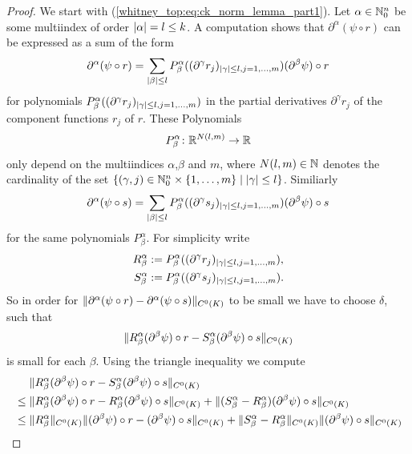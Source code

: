 \begin{proof}
    We start with (\ref{whitney_top:eq:ck_norm_lemma_part1}). Let $\alpha \in \mathbb{N}_0^n$ be some multiindex of order $\lvert\alpha\rvert = l \leq k$. A computation shows that $\partial^\alpha(\psi \circ r)$ can be expressed as a sum of the form 
    \[
    \partial^\alpha(\psi \circ r) = \sum_{\lvert\beta\rvert\leq l} P_\beta^\alpha((\partial^\gamma r_j)_{\lvert\gamma\rvert \leq l, j = 1,\ldots,m}) (\partial^\beta \psi) \circ r
    \]
    for polynomials $P_\beta^\alpha((\partial^\gamma r_j)_{\lvert\gamma\rvert \leq l, j = 1,\ldots,m})$ in the partial derivatives $\partial^\gamma r_j$ of the component functions $r_j$ of $r$. These Polynomials 
    \[
    P_\beta^\alpha \colon \mathbb{R}^{N(l,m)} \to \mathbb{R}
    \]
    only depend on the multiindices $\alpha$,$\beta$ and $m$, where $N(l,m) \in \mathbb{N}$ denotes the cardinality of the set $\{(\gamma,j) \in \mathbb{N}_0^n \times \{1,\ldots,m\} \mid \lvert\gamma\rvert \leq l\}$. Similiarly 
    \[
    \partial^\alpha(\psi \circ s) = \sum_{\lvert\beta\rvert\leq l} P_\beta^\alpha((\partial^\gamma s_j)_{\lvert\gamma\rvert \leq l, j = 1,\ldots,m}) (\partial^\beta \psi) \circ s
    \]
    for the same polynomials $P_\beta^\alpha$. For simplicity write 
    \begin{align*}
        R_\beta^\alpha &:= P_\beta^\alpha((\partial^\gamma r_j)_{\lvert\gamma\rvert \leq l, j = 1,\ldots,m}), \\
        S_\beta^\alpha &:= P_\beta^\alpha((\partial^\gamma s_j)_{\lvert\gamma\rvert \leq l, j = 1,\ldots,m}).
    \end{align*}
    So in order for $\lVert\partial^\alpha(\psi \circ r) - \partial^\alpha(\psi \circ s)\rVert_{C^0(K)}$ to be small we have to choose $\delta$, such that 
    \[
    \lVert R_\beta^\alpha (\partial^\beta \psi) \circ r - S_\beta^\alpha (\partial^\beta \psi) \circ s\rVert_{C^0(K)}
    \]
    is small for each $\beta$. Using the triangle inequality we compute 
    \begin{align}
        & \phantom{{}\leq{}} \norm{R_\beta^\alpha (\partial^\beta \psi) \circ r - S_\beta^\alpha (\partial^\beta \psi) \circ s}_{C^0(K)} \notag \\ 
        &\leq \norm{R_\beta^\alpha (\partial^\beta \psi) \circ r - R_\beta^\alpha (\partial^\beta \psi) \circ s}_{C^0(K)} + \norm{(S_\beta^\alpha - R_\beta^\alpha) (\partial^\beta \psi) \circ s}_{C^0(K)} \notag \\
        & \leq \norm{R_\beta^\alpha}_{C^0(K)}\norm{(\partial^\beta \psi) \circ r - (\partial^\beta \psi) \circ s}_{C^0(K)} +  \norm{S_\beta^\alpha - R_\beta^\alpha}_{C^0(K)}  \norm{(\partial^\beta \psi) \circ s}_{C^0(K)} \label{whitney_top:eq:ck_norm_lemma_long_norm}

\end{align}
\end{proof}
